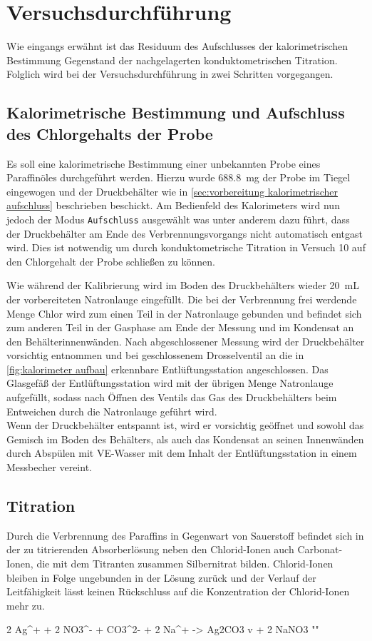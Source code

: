\chapter{Versuchsdurchführung}
	Wie eingangs erwähnt ist das Residuum des Aufschlusses der kalorimetrischen Bestimmung Gegenstand der nachgelagerten konduktometrischen Titration.
	Folglich wird bei der Versuchsdurchführung in zwei Schritten vorgegangen.
	\section{Kalorimetrische Bestimmung und Aufschluss des Chlorgehalts der Probe}\label{sec:kalorimeter bestimmung unbekannte probe}
		Es soll eine kalorimetrische Bestimmung einer unbekannten Probe eines Paraffinöles durchgeführt werden. Hierzu wurde \SI{688,8}{mg} der Probe
		im Tiegel eingewogen und der Druckbehälter wie in \cref{sec:vorbereitung kalorimetrischer aufschluss} beschrieben beschickt. Am Bedienfeld
		des Kalorimeters wird nun jedoch der Modus \texttt{Aufschluss} ausgewählt was unter anderem dazu führt, dass der Druckbehälter am Ende
		des Verbrennungsvorgangs nicht automatisch entgast wird. Dies ist notwendig um durch konduktometrische Titration in Versuch 10
		auf den Chlorgehalt der Probe schließen zu können.\par
		Wie während der Kalibrierung wird im Boden des Druckbehälters wieder \SI{20}{mL} der vorbereiteten Natronlauge eingefüllt. Die bei der Verbrennung frei werdende
		Menge Chlor wird zum einen Teil in der Natronlauge gebunden und befindet sich zum anderen Teil in der Gasphase am Ende der Messung und im
		Kondensat an den Behälterinnenwänden. Nach abgeschlossener Messung wird der Druckbehälter vorsichtig entnommen und bei geschlossenem
		Drosselventil an die in \cref{fig:kalorimeter aufbau} erkennbare Entlüftungsstation angeschlossen. Das Glasgefäß der Entlüftungsstation wird
		mit der übrigen Menge Natronlauge aufgefüllt, sodass nach Öffnen des Ventils das Gas des Druckbehälters beim Entweichen durch
		die Natronlauge geführt wird.\\
		Wenn der Druckbehälter entspannt ist, wird er vorsichtig geöffnet und sowohl das Gemisch im Boden des Behälters, als auch das Kondensat an
		seinen Innenwänden durch Abspülen mit VE-Wasser mit dem Inhalt der Entlüftungsstation in einem Messbecher vereint.
	\section{Titration}\label{sec:titration}
		Durch die Verbrennung des Paraffins in Gegenwart von Sauerstoff befindet sich in der zu titrierenden Absorberlösung neben den Chlorid-Ionen
		auch Carbonat-Ionen, die mit dem Titranten zusammen Silbernitrat bilden. Chlorid-Ionen bleiben in Folge ungebunden in der Lösung zurück
		und der Verlauf der Leitfähigkeit lässt keinen Rückschluss auf die Konzentration der Chlorid-Ionen mehr zu.
		\begin{reaction}
			2 Ag^+ + 2 NO3^- + CO3^{2-} + 2 Na^+ -> Ag2CO3 v + 2 NaNO3 "\label{re:silbercarbonat bildung}"
		\end{reaction}

